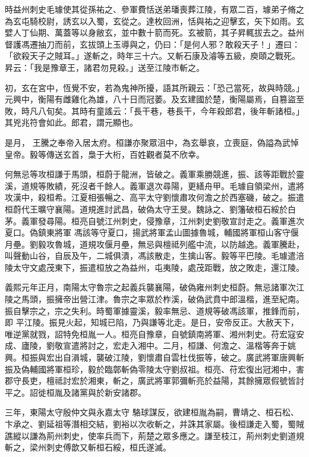 \begin{pinyinscope}
 時益州刺史毛璩使其從孫祐之、參軍費恬送弟璠喪葬江陵，有眾二百，璩弟子脩之為玄屯騎校尉，誘玄以入蜀，玄從之。達枚回洲，恬與祐之迎擊玄，矢下如雨。玄
 嬖人丁仙期、萬蓋等以身敝玄，並中數十箭而死。玄被箭，其子昇輒拔去之。益州督護馮遷抽刀而前，玄拔頭上玉導與之，仍曰：「是何人邪？敢殺天子！」遷曰：「欲殺天子之賊耳。」遂斬之，時年三十六。又斬石康及濬等五級，庾頤之戰死。昇云：「我是豫章王，諸君勿見殺。」送至江陵市斬之。



 初，玄在宮中，恆覺不安，若為鬼神所擾，語其所親云：「恐己當死，故與時競。」元興中，衡陽有雌雞化為雄，八十日而冠萎。及玄建國於楚，衡陽屬焉，自篡盜至敗，時凡八旬矣。其時有童謠云：「長干巷，巷長干，今年殺郎君，後年斬諸桓。」其兇兆符會如此。郎君，謂元顯也。



 是月，
 王騰之奉帝入居太府。桓謙亦聚眾沮中，為玄舉哀，立喪庭，偽謚為武悼皇帝。毅等傳送玄首，梟于大桁，百姓觀者莫不欣幸。



 何無忌等攻桓謙于馬頭，桓蔚于龍洲，皆破之。義軍乘勝競進，振、該等距戰於靈溪，道規等敗績，死沒者千餘人。義軍退次尋陽，更繕舟甲。毛璩自領梁州，遣將攻漢中，殺桓希。江夏相張暢之、高平太守劉懷肅攻何澹之於西塞磯，破之。振遣桓蔚代王曠守襄陽。道規進討武昌，破偽太守王旻。魏詠之、劉籓破桓石綏於白茅。義軍發尋陽。桓亮自號江州刺史，侵豫章，江州刺史劉敬宣討走之。義軍進次夏口。偽鎮東將軍
 馮該等守夏口，揚武將軍孟山圖據魯城，輔國將軍桓山客守偃月壘。劉毅攻魯城，道規攻偃月壘，無忌與檀祗列艦中流，以防越逸。義軍騰赴，叫聲動山谷，自辰及午，二城俱潰，馮該散走，生擒山客。毅等平巴陵。毛璩遣涪陵太守文處茂東下，振遣桓放之為益州，屯夷陵，處茂距戰，放之敗走，還江陵。



 義熙元年正月，南陽太守魯宗之起義兵襲襄陽，破偽雍州刺史桓蔚。無忌諸軍次江陵之馬頭，振擁帝出營江津。魯宗之率眾於柞溪，破偽武賁中郎溫楷，進至紀南。振自擊宗之，宗之失利。時蜀軍據靈溪，毅率無忌、道規等破馮該軍，推鋒而前，即
 平江陵。振見火起，知城已陷，乃與謙等北走。是日，安帝反正。大赦天下，唯逆黨就戮，詔特免桓胤一人。桓亮自豫章，自號鎮南將軍、湘州刺史。苻宏寇安成、廬陵，劉敬宣遣將討之，宏走入湘中。二月，桓謙、何澹之、溫楷等奔于姚興。桓振與宏出自溳城，襲破江陵，劉懷肅自雲杜伐振等，破之。廣武將軍唐興斬振及偽輔國將軍桓珍，毅於臨鄣斬偽零陵太守劉叔祖。桓亮、苻宏復出冠湘中，害郡守長吏，檀祗討宏於湘東，斬之，廣武將軍郭彌斬亮於益陽，其餘擁眾假號皆討平之。詔徙桓胤及諸黨與於新安諸郡。



 三年，東陽太守殷仲文與永嘉太守
 駱球謀反，欲建桓胤為嗣，曹靖之、桓石松、卞承之、劉延祖等潛相交結，劉裕以次收斬之，并誅其家屬。後桓謙走入蜀，蜀賊譙縱以謙為荊州刺史，使率兵而下，荊楚之眾多應之。謙至枝江，荊州刺史劉道規斬之，梁州刺史傅歆又斬桓石綏，桓氏遂滅。




\end{pinyinscope}
